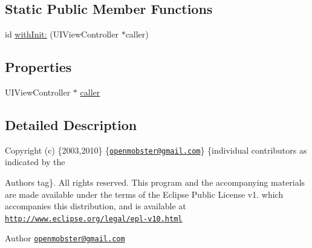 \subsection*{\-Static \-Public \-Member \-Functions}
\begin{DoxyCompactItemize}
\item 
id \hyperlink{interface_command_context_a7e3659ae01648b7db18812a2b1e4cf5c}{with\-Init\-:} (\-U\-I\-View\-Controller $\ast$caller)
\end{DoxyCompactItemize}
\subsection*{\-Properties}
\begin{DoxyCompactItemize}
\item 
\-U\-I\-View\-Controller $\ast$ \hyperlink{interface_command_context_a3da5c5d788e8d7402907548f7725614c}{caller}
\end{DoxyCompactItemize}


\subsection{\-Detailed \-Description}
\-Copyright (c) \{2003,2010\} \{\href{mailto:openmobster@gmail.com}{\tt openmobster@gmail.\-com}\} \{individual contributors as indicated by the \begin{DoxyAuthor}{\-Authors}
tag\}. \-All rights reserved. \-This program and the accompanying materials are made available under the terms of the \-Eclipse \-Public \-License v1. which accompanies this distribution, and is available at \href{http://www.eclipse.org/legal/epl-v10.html}{\tt http\-://www.\-eclipse.\-org/legal/epl-\/v10.\-html}
\end{DoxyAuthor}
\begin{DoxyAuthor}{\-Author}
\href{mailto:openmobster@gmail.com}{\tt openmobster@gmail.\-com} 
\end{DoxyAuthor}


